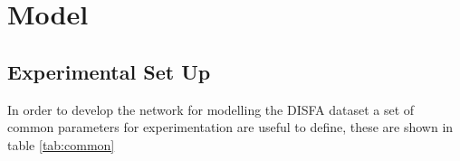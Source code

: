 \chapter{Model} \label{sec:model}

  \section{Experimental Set Up}
    In order to develop the network for modelling the DISFA dataset a set of common
    parameters for experimentation are useful to define, these are shown in table \ref{tab:common}

